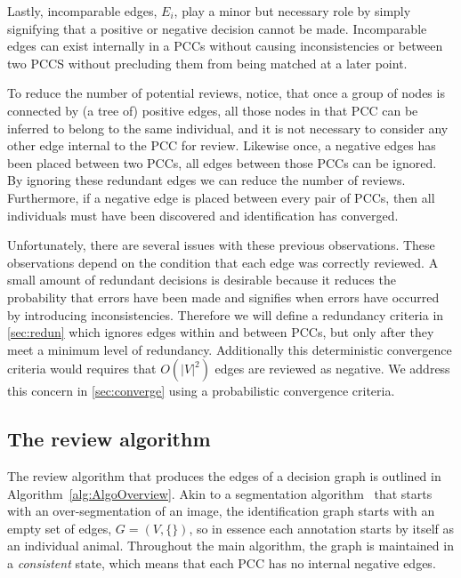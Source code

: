 Lastly, incomparable edges, $E_i$, play a minor but necessary role by simply signifying that a positive or negative
decision cannot be made.  Incomparable edges can exist internally in a PCCs without causing inconsistencies or
between two PCCS without precluding them from being matched at a later point.

To reduce the number of potential reviews, notice, that once a group of nodes is connected by (a tree of) positive
edges, all those nodes in that PCC can be inferred to belong to the same individual, and it is not necessary to
consider any other edge internal to the PCC for review. Likewise once, a negative edges has been placed between two
PCCs, all edges between those PCCs can be ignored. By ignoring these redundant edges we can reduce the number of
reviews. Furthermore, if a negative edge is placed between every pair of PCCs, then all individuals must have been
discovered and identification has converged.

Unfortunately, there are several issues with these previous observations. These observations depend on the
condition that each edge was correctly reviewed. A small amount of redundant decisions is desirable because it
reduces the probability that errors have been made and signifies when errors have occurred by introducing
inconsistencies. Therefore we will define a redundancy criteria in \cref{sec:redun} which ignores edges within and
between PCCs, but only after they meet a minimum level of redundancy. Additionally this deterministic convergence
criteria would requires that $O(|V|^2)$ edges are reviewed as negative. We address this concern in
\cref{sec:converge} using a probabilistic convergence criteria.


\subsection{The review algorithm}\label{sub:graphalgo}


The review algorithm that produces the edges of a decision graph is outlined in Algorithm~\ref{alg:AlgoOverview}.
Akin to a segmentation algorithm~\cite{fulkerson_class_2009} that starts with an over-segmentation of an image, the
identification graph starts with an empty set of edges, $G = (V, \{ \})$, so in essence each annotation starts by
itself as an individual animal. Throughout the main algorithm, the graph is maintained in a \emph{consistent}
state, which means that each PCC has no internal negative edges.

